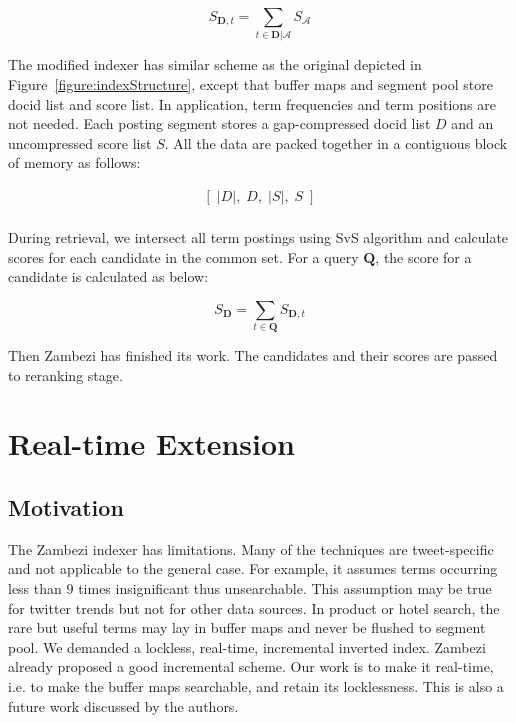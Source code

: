\begin{equation}
  S_{\mathbf{D}, t} = \sum_{t \in \mathbf{D} | \mathcal{A}} S_{\mathcal{A}}
\end{equation}

The modified indexer has similar scheme as the original depicted in Figure~\ref{figure:indexStructure}, except that buffer maps and segment pool store docid list and score list. In application, term frequencies and term positions are not needed. Each posting segment stores a gap-compressed docid list $D$ and an uncompressed score list $S$. All the data are packed together in a contiguous block of memory as follows:

\begin{displaymath}
  \begin{array}{l}
    \left[\; |D|,\; D,\; |S|,\; S\; \right] \\
  \end{array}
\end{displaymath}

During retrieval, we intersect all term postings using SvS algorithm and calculate scores for each candidate in the common set. For a query $\mathbf{Q}$, the score for a candidate is calculated as below:

\begin{equation}
  S_{\mathbf{D}} = \sum_{t \in \mathbf{Q}} S_{\mathbf{D}, t}
\end{equation}

Then Zambezi has finished its work. The candidates and their scores are passed to reranking stage.

\section{Real-time Extension}

\subsection{Motivation}

The Zambezi indexer has limitations. Many of the techniques are tweet-specific and not applicable to the general case. For example, it assumes terms occurring less than $9$ times insignificant thus unsearchable. This assumption may be true for twitter trends but not for other data sources. In product or hotel search, the rare but useful terms may lay in buffer maps and never be flushed to segment pool. We demanded a lockless, real-time, incremental inverted index. Zambezi already proposed a good incremental scheme. Our work is to make it real-time, i.e. to make the buffer maps searchable, and retain its locklessness. This is also a future work discussed by the authors.

